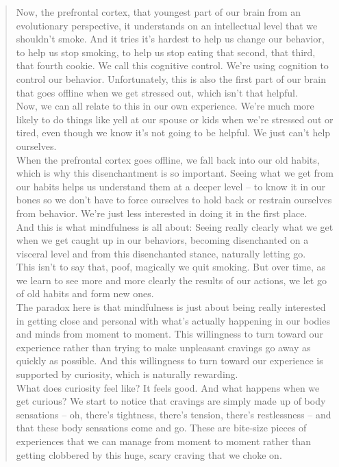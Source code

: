 \begin{quote}
Now, the prefrontal cortex, that youngest part of our brain from an evolutionary perspective, it understands on an intellectual level that we shouldn't smoke. And it tries it's hardest to help us change our behavior, to help us stop smoking, to help us stop eating that second, that third, that fourth cookie. We call this cognitive control. We're using cognition to control our behavior. Unfortunately, this is also the first part of our brain that goes offline when we get stressed out, which isn't that helpful.\\
Now, we can all relate to this in our own experience. We're much more likely to do things like yell at our spouse or kids when we're stressed out or tired, even though we know it's not going to be helpful. We just can't help ourselves.\\
When the prefrontal cortex goes offline, we fall back into our old habits, which is why this disenchantment is so important. Seeing what we get from our habits helps us understand them at a deeper level -- to know it in our bones so we don't have to force ourselves to hold back or restrain ourselves from behavior. We're just less interested in doing it in the first place.\\
And this is what mindfulness is all about: Seeing really clearly what we get when we get caught up in our behaviors, becoming disenchanted on a visceral level and from this disenchanted stance, naturally letting go.\\
This isn't to say that, poof, magically we quit smoking. But over time, as we learn to see more and more clearly the results of our actions, we let go of old habits and form new ones.\\
The paradox here is that mindfulness is just about being really interested in getting close and personal with what's actually happening in our bodies and minds from moment to moment. This willingness to turn toward our experience rather than trying to make unpleasant cravings go away as quickly as possible. And this willingness to turn toward our experience is supported by curiosity, which is naturally rewarding.\\
What does curiosity feel like? It feels good. And what happens when we get curious? We start to notice that cravings are simply made up of body sensations -- oh, there's tightness, there's tension, there's restlessness -- and that these body sensations come and go. These are bite-size pieces of experiences that we can manage from moment to moment rather than getting clobbered by this huge, scary craving that we choke on.\\

\end{quote}
